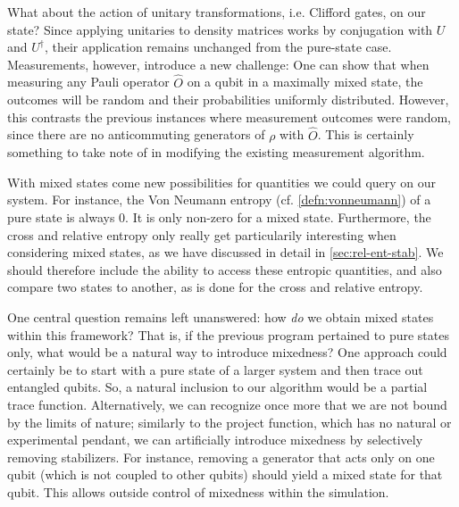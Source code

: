 What about the action of unitary transformations, i.e. Clifford gates, on our
state? Since applying unitaries to density matrices works by conjugation with
$U$ and $U^\dagger$, their application remains unchanged from the pure-state
case. Measurements, however, introduce a new challenge:
One can show that when measuring any
Pauli operator $\hat{O}$ on a qubit in a maximally mixed state, the outcomes
will be random and their probabilities uniformly distributed. However, this
contrasts the previous instances where measurement outcomes were random, since
there are no anticommuting generators of $\rho$ with $\hat{O}$. This is
certainly something to take note of in modifying the existing measurement
algorithm.

With mixed states come new possibilities for quantities we could query on our
system. For instance, the Von Neumann entropy (cf. \cref{defn:vonneumann}) of a
pure state is always $0$. It is only non-zero for a mixed state.
Furthermore, the cross and relative entropy only
really get particularily interesting when considering mixed states, as we have
discussed in detail in \cref{sec:rel-ent-stab}. We should therefore include the
ability to access these entropic quantities, and also compare two states to
another, as is done for the cross and relative entropy.

One central question remains left unanswered: how \emph{do} we obtain mixed
states within this framework?  That is, if the previous program pertained to
pure states only, what would be a natural way to introduce mixedness?  One
approach could certainly be to start with a pure state of a larger system and
then trace out entangled qubits.  So, a natural inclusion to our algorithm
would be a partial trace function.  Alternatively, we can recognize once more
that we are not bound by the limits of nature; similarly to the project
function, which has no natural or experimental pendant, we can artificially
introduce mixedness by selectively removing stabilizers.
For instance, removing a generator that acts only on one qubit (which is not
coupled to other qubits) should yield a mixed state for that qubit. This allows
outside control of mixedness within the simulation.

